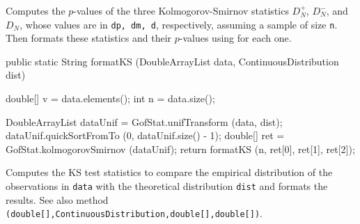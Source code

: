 \begin{tabb}  Computes the $p$-values of the three Kolmogorov-Smirnov statistics
  $D_N^+$, $D_N^-$, and $D_N$, whose values are in \texttt{dp, dm, d},
  respectively, assuming a sample of size \texttt{n}.
  Then formats these statistics and their $p$-values
  using  for each one.
\end{tabb}
\begin{htmlonly}
\end{htmlonly}
\begin{code}

   public static String formatKS (DoubleArrayList data,
                                  ContinuousDistribution dist)\begin{hide} {

      double[] v = data.elements();
      int n = data.size();

      DoubleArrayList dataUnif = GofStat.unifTransform (data, dist);
      dataUnif.quickSortFromTo (0, dataUnif.size() - 1);
      double[] ret = GofStat.kolmogorovSmirnov (dataUnif);
      return formatKS (n, ret[0], ret[1], ret[2]);
   }\end{hide}
\end{code}
\begin{tabb} Computes the KS test statistics to compare the
 empirical distribution of the observations in \texttt{data}
 with the theoretical distribution \texttt{dist} and
 formats the results. See also method
\texttt{(double[],ContinuousDistribution,double[],double[])}.
\end{tabb}
\begin{htmlonly}
\end{htmlonly}
